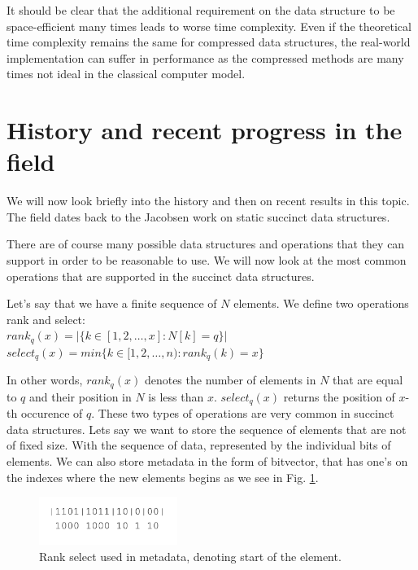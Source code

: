 It should be clear that the additional requirement on the data structure to be space-efficient many times leads to worse time complexity. Even if the theoretical time complexity remains the same for compressed data structures, the real-world implementation can suffer in performance as the compressed methods are many times not ideal in the classical computer model.

\section{History and recent progress in the field}

We will now look briefly into the history and then on recent results in this topic. The field dates back to the Jacobsen work on static succinct data structures.

There are of course many possible data structures and operations that they can support in order to be reasonable to use. We will now look at the most common operations that are supported in the succinct data structures.

\begin{theorem}
Let's say that we have a finite sequence of $N$ elements.
We define two operations rank and select: \\
$rank_q(x) = | \{ k \in [ 1, 2, \ldots, x]:N[k] = q  \} |$ \\
$select_q(x) = min \{ k \in [ 1, 2, \ldots, n):rank_q(k)=x  \} $
\end{theorem}

In other words, $rank_q(x)$ denotes the number of elements in $N$ that are equal to $q$ and their position in $N$ is less than $x$. $select_q(x)$ returns the position of $x$-th occurence of $q$.
These two types of operations are very common in succinct data structures. Lets say we want to store the sequence of elements that are not of fixed size.
With the sequence of data, represented by the individual bits of elements. We can also store metadata in the form of bitvector, that has one's on the indexes
where the new elements begins as we see in Fig. \ref{obr:obr_rank_select}.

\begin{figure}
\centerline{\includegraphics[width=0.4\textwidth]{images/obr_rank_select}}
\caption[Rank select usage in representation of sequence of elements with different size]{Rank select used in metadata, denoting start of the element.}
\label{obr:obr_rank_select}
\end{figure}

